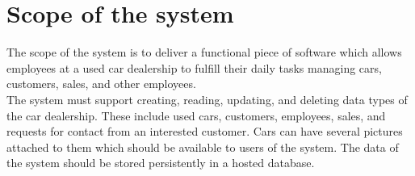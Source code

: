 \section{Scope of the system}
The scope of the system is to deliver a functional piece of software which allows employees at a used car dealership to fulfill their daily tasks managing cars, customers, sales, and other employees.\\

The system must support creating, reading, updating, and deleting data types of the car dealership. 
These include used cars, customers, employees, sales, and requests for contact from an interested customer. 
Cars can have several pictures attached to them which should be available to users of the system. 
The data of the system should be stored persistently in a hosted database. 
